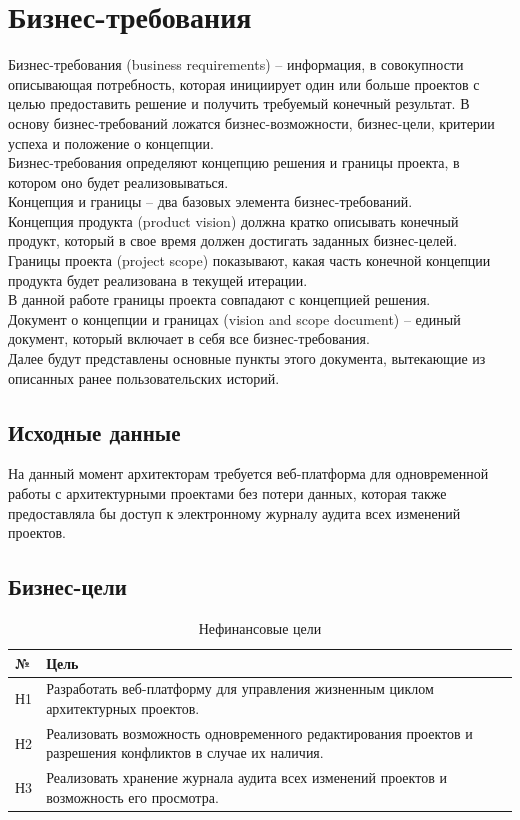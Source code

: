 \documentclass[a4paper,14pt]{extreport} %
\begin{document}
\newpage
\section{Бизнес-требования}

Бизнес-требования (business requirements) -- информация, в совокупности описывающая потребность, которая инициирует один или больше проектов с целью предоставить решение и получить требуемый конечный результат. В основу бизнес-требований ложатся бизнес-возможности, бизнес-цели, критерии успеха и положение о концепции. \\
Бизнес-требования определяют концепцию решения и границы проекта, в котором оно будет реализовываться. \\
Концепция и границы -- два базовых элемента бизнес-требований. \\ Концепция продукта (product vision) должна кратко описывать конечный продукт, который в свое время должен достигать заданных бизнес-целей. \\
Границы проекта (project scope) показывают, какая часть конечной концепции продукта будет реализована в текущей итерации. \\
В данной работе границы проекта совпадают с концепцией решения. \\
Документ о концепции и границах (vision and scope document) -- единый документ, который включает в себя все бизнес-требования. \\
Далее будут представлены основные пункты этого документа, вытекающие из описанных ранее пользовательских историй.

\subsection{Исходные данные}

На данный момент архитекторам требуется веб-платформа для одновременной работы с архитектурными проектами без потери данных, которая также предоставляла бы доступ к электронному журналу аудита всех изменений проектов.

\newpage
\subsection{Бизнес-цели}

\begin{table}[H]
\caption {Нефинансовые цели} \label{tab:title}
\begin{center}
\begin{tabular}{ | l | p{14cm} | }
\hline
№ & Цель \\
\hline
Н1 & Разработать веб-платформу для управления жизненным циклом	архитектурных проектов. \\
\hline
Н2 & Реализовать возможность одновременного редактирования проектов и разрешения конфликтов в случае их наличия. \\
\hline
Н3 & Реализовать хранение журнала аудита всех изменений проектов и возможность его просмотра. \\
\hline
\end{tabular}
\end{center}
\end{table}
 
\end{document}
